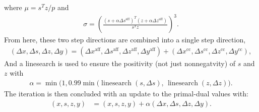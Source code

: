 %
where $\mu = s^Tz/p$ and 
%
\begin{align}
    \sigma=\left(\frac{\left(s+\alpha \Delta s^{\mathrm{aff}}\right)^{T}\left(z+\alpha \Delta z^{\mathrm{aff}}\right)}{s^{T} z}\right)^{3}.
\end{align}
%
From here, these two step directions are combined into a single step direction,
%
\begin{align}
    (\Delta x, \Delta s, \Delta z, \Delta y) = (\Delta x^\text{aff}, \Delta s^\text{aff}, \Delta z^\text{aff}, \Delta y^\text{aff}) + (\Delta x^\text{cc}, \Delta s^\text{cc}, \Delta z^\text{cc}, \Delta y^\text{cc}),
\end{align}
%
And a linesearch is used to ensure the positivity (not just nonnegatvity) of $s$ and $z$ with 
%
\begin{align}
    \alpha = \min\big(1, 0.99 \min(\operatorname{linesearch}(s, \Delta s),\, \operatorname{linesearch}(z, \Delta z)\big).
\end{align}
%
The iteration is then concluded with an update to the primal-dual values with:
% 
\begin{align}
    (x, s, z, y) &= (x, s, z, y) + \alpha(\Delta x, \Delta s, \Delta z, \Delta y).
\end{align}
%
